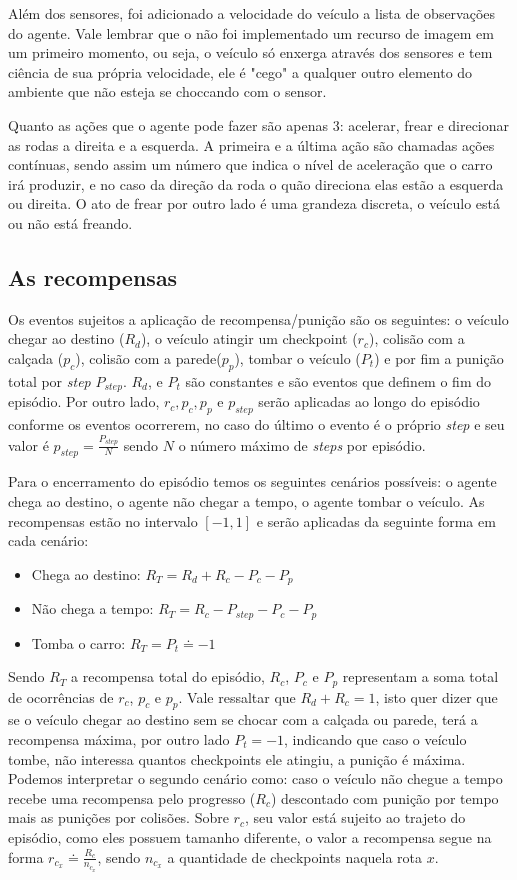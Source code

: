  Além dos sensores, foi adicionado a velocidade do veículo a lista de observações do agente. Vale lembrar que o não foi implementado um recurso de imagem em um primeiro momento, ou seja, o veículo só enxerga através dos sensores e tem ciência de sua própria velocidade, ele é "cego" a qualquer outro elemento do ambiente que não esteja se choccando com o sensor.

 Quanto as ações que o agente pode fazer são apenas 3: acelerar, frear e direcionar as rodas a direita e a esquerda. A primeira e a última ação são chamadas ações contínuas, sendo assim um número que indica o nível de aceleração que o carro irá produzir, e no caso da direção da roda o quão direciona elas estão a esquerda ou direita. O ato de frear por outro lado é uma grandeza discreta, o veículo está ou não está freando.

\subsection{As recompensas}
Os eventos sujeitos a aplicação de recompensa/punição são os seguintes: o veículo chegar ao destino ($R_d$), o veículo atingir um checkpoint ($r_c$), colisão com a calçada ($p_c$), colisão com a parede($p_p$), tombar o veículo ($P_t$) e por fim a punição total por \textit{step} $P_{step}$. $R_d$, e $P_t$ são constantes e são eventos que definem o fim do episódio. Por outro lado, $r_c, p_c, p_p \text{ e } p_{step}$ serão aplicadas ao longo do episódio conforme os eventos ocorrerem, no caso do último o evento é o próprio \textit{step} e seu valor é $p_{step} = \frac{P_{step}}{N}$ sendo $N$ o número máximo de \textit{steps} por episódio.

Para o encerramento do episódio temos os seguintes cenários possíveis: o agente chega ao destino, o agente não chegar a tempo, o agente tombar o veículo. As recompensas estão no intervalo $[-1,1]$ e serão aplicadas da seguinte forma em cada cenário:

\begin{itemize}
   \item Chega ao destino: $R_T = R_d + R_c - P_c - P_p$
   \item Não chega a tempo: $R_T = R_c - P_{step} - P_c - P_p$
   \item Tomba o carro: $R_T = P_t \doteq -1$
\end{itemize}

Sendo $R_T$ a recompensa total do episódio, $R_c$, $P_c$ e $P_p$ representam a soma total de ocorrências de $r_c$, $p_c$ e $p_p$. Vale ressaltar que $R_d + R_c = 1$, isto quer dizer que se o veículo chegar ao destino sem se chocar com a calçada ou parede, terá a recompensa máxima, por outro lado $P_t = -1$, indicando que caso o veículo tombe, não interessa quantos checkpoints ele atingiu, a punição é máxima. Podemos interpretar o segundo cenário como: caso o veículo não chegue a tempo recebe uma recompensa pelo progresso ($R_c$) descontado com punição por tempo mais as punições por colisões. Sobre $r_c$, seu valor está sujeito ao trajeto do episódio, como eles possuem tamanho diferente, o valor a recompensa segue na forma $r_{c_x} \doteq \frac{R_c}{n_{c_x}}$, sendo $n_{c_x}$ a quantidade de checkpoints naquela rota $x$.

